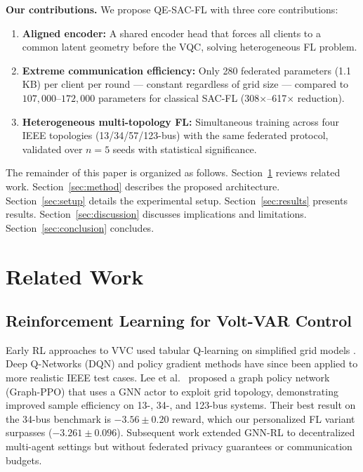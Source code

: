 \documentclass[journal]{IEEEtran}
\begin{document}
\textbf{Our contributions.} We propose QE-SAC-FL with three core contributions:

\begin{enumerate}
    \item \textbf{Aligned encoder:} A shared encoder head that forces all
    clients to a common latent geometry before the VQC, solving heterogeneous FL problem.

    \item \textbf{Extreme communication efficiency:} Only 280 federated
    parameters (1.1\,KB) per client per round --- constant regardless of
    grid size --- compared to $107{,}000$--$172{,}000$ parameters for
    classical SAC-FL (308$\times$--617$\times$ reduction).

    \item \textbf{Heterogeneous multi-topology FL:} Simultaneous training
    across four IEEE topologies (13/34/57/123-bus) with the same federated
    protocol, validated over $n=5$ seeds with statistical significance.
\end{enumerate}

The remainder of this paper is organized as follows.
Section~\ref{sec:related} reviews related work.
Section~\ref{sec:method} describes the proposed architecture.
Section~\ref{sec:setup} details the experimental setup.
Section~\ref{sec:results} presents results.
Section~\ref{sec:discussion} discusses implications and limitations.
Section~\ref{sec:conclusion} concludes.

\section{Related Work}
\label{sec:related}

\subsection{Reinforcement Learning for Volt-VAR Control}

Early RL approaches to VVC used tabular Q-learning on simplified grid models
\cite{lin2025qesac}. Deep Q-Networks (DQN) and policy gradient methods have
since been applied to more realistic IEEE test cases. Lee et al.\
\cite{lee2022graph} proposed a graph policy network (Graph-PPO) that uses
a GNN actor to exploit grid topology, demonstrating improved sample efficiency
on 13-, 34-, and 123-bus systems. Their best result on the 34-bus benchmark
is $-3.56 \pm 0.20$ reward, which our personalized FL variant surpasses
($-3.261 \pm 0.096$). Subsequent work \cite{multiagent2023} extended GNN-RL
to decentralized multi-agent settings but without federated privacy guarantees
or communication budgets.
\end{document}
